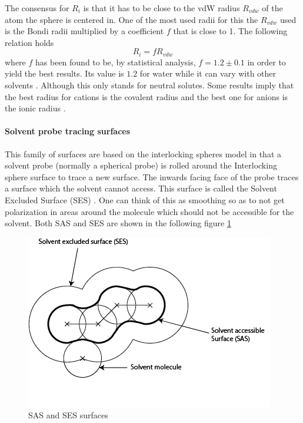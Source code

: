 \documentclass[../master_thesis.tex]{subfiles}
\begin{document}
The consensus for $R_i$ is that it has to be close to the \ac{vdW} radius
$R_{vdw}$ of the atom the sphere is centered in. One of the most used radii for
this  the $R_{vdw}$ used is the Bondi radii \cite{doi:10.1021/j100785a001,
Tomasi:2005ipa} multiplied by a coefficient $f$ that is close to 1. The
following relation holds
\cite{Tomasi:1994wt}
\begin{equation}
  R_i = fR_{vdw}
\end{equation}
where $f$ has been found to be, by statistical analysis, $f = 1.2 \pm 0.1$ in order to
yield the best results. Its value is $1.2$ for water while it can vary with
other solvents \cite{Tomasi:1994wt}. Although this only stands for neutral
solutes. Some results imply that the best radius for cations is the covalent
radius and the best one for anions is the ionic radius \cite{Tomasi:1994wt}.
\paragraph{Solvent probe tracing surfaces}\label{Spts}
This family of surfaces are based on the interlocking spheres model in that a
solvent probe (normally a spherical probe) is rolled around the Interlocking
sphere surface to trace a new surface. The inwards facing face of the probe traces a surface
which the solvent cannot access. This surface is called the Solvent Excluded
Surface (SES) \cite{Tomasi:2005ipa, Mennucci:2018}.  One can think of this as
smoothing so as to not get polarization in areas around the molecule which should
not be accessible for the solvent. Both SAS and SES are shown in the following
figure \ref{fig:SASSEShomemade}
\begin{figure}[ht]
  \includegraphics[width=\linewidth]{img/SASSES.png}
  \caption{SAS and SES surfaces}
  \label{fig:SASSEShomemade}
\end{figure}
\end{document}
